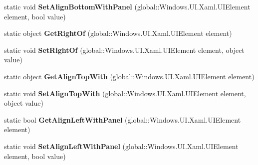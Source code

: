 \begin{DoxyCompactItemize}
static void {\bfseries Set\+Align\+Bottom\+With\+Panel} (global\+::\+Windows.\+U\+I.\+Xaml.\+U\+I\+Element element, bool value)
\item 
\mbox{\label{class_windows_1_1_u_i_1_1_xaml_1_1_controls_1_1_relative_panel_ad529f58ba41f4e74aaae2ee84288f5d2}} 
static object {\bfseries Get\+Right\+Of} (global\+::\+Windows.\+U\+I.\+Xaml.\+U\+I\+Element element)
\item 
\mbox{\label{class_windows_1_1_u_i_1_1_xaml_1_1_controls_1_1_relative_panel_a9559e4960630a4b153111ba23f0e51a0}} 
static void {\bfseries Set\+Right\+Of} (global\+::\+Windows.\+U\+I.\+Xaml.\+U\+I\+Element element, object value)
\item 
\mbox{\label{class_windows_1_1_u_i_1_1_xaml_1_1_controls_1_1_relative_panel_a26c367e9f2c099f097099bb693c02c02}} 
static object {\bfseries Get\+Align\+Top\+With} (global\+::\+Windows.\+U\+I.\+Xaml.\+U\+I\+Element element)
\item 
\mbox{\label{class_windows_1_1_u_i_1_1_xaml_1_1_controls_1_1_relative_panel_a6b8a7aa477bd88abf3a2339481e79caa}} 
static void {\bfseries Set\+Align\+Top\+With} (global\+::\+Windows.\+U\+I.\+Xaml.\+U\+I\+Element element, object value)
\item 
\mbox{\label{class_windows_1_1_u_i_1_1_xaml_1_1_controls_1_1_relative_panel_a222a12643fe778467363d2213978054e}} 
static bool {\bfseries Get\+Align\+Left\+With\+Panel} (global\+::\+Windows.\+U\+I.\+Xaml.\+U\+I\+Element element)
\item 
\mbox{\label{class_windows_1_1_u_i_1_1_xaml_1_1_controls_1_1_relative_panel_acf50525353e5484990104e58477683b5}} 
static void {\bfseries Set\+Align\+Left\+With\+Panel} (global\+::\+Windows.\+U\+I.\+Xaml.\+U\+I\+Element element, bool value)
\item 
\mbox{\label{class_windows_1_1_u_i_1_1_xaml_1_1_controls_1_1_relative_panel_a79e2ec081a759fa726ebcde40fc95107}} 

\end{DoxyCompactItemize}
